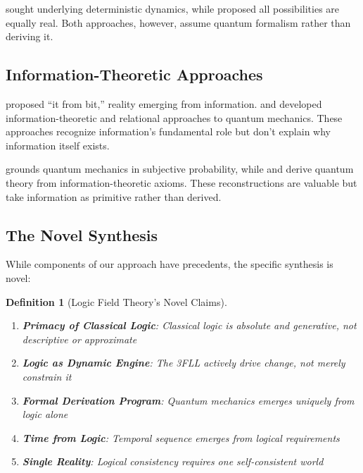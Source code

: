 \documentclass[12pt,a4paper]{article}
\newtheorem{definition}{Definition}
\begin{document}
\citet{bohm1952suggested} sought underlying deterministic dynamics, while \citet{everett1957relative} proposed all possibilities are equally real. Both approaches, however, assume quantum formalism rather than deriving it.

\subsection{Information-Theoretic Approaches}

\citet{wheeler1990information} proposed ``it from bit,'' reality emerging from information. \citet{brukner2001conceptual} and \citet{rovelli1996relational} developed information-theoretic and relational approaches to quantum mechanics. These approaches recognize information's fundamental role but don't explain why information itself exists.

\citet{fuchs2010qbism} grounds quantum mechanics in subjective probability, while \citet{hardy2001quantum} and \citet{chiribella2011informational} derive quantum theory from information-theoretic axioms. These reconstructions are valuable but take information as primitive rather than derived.

\subsection{The Novel Synthesis}

While components of our approach have precedents, the specific synthesis is novel:

\begin{definition}[Logic Field Theory's Novel Claims]
~\\
\begin{enumerate}
\item \textbf{Primacy of Classical Logic}: Classical logic is absolute and generative, not descriptive or approximate
\item \textbf{Logic as Dynamic Engine}: The 3FLL actively drive change, not merely constrain it
\item \textbf{Formal Derivation Program}: Quantum mechanics emerges uniquely from logic alone
\item \textbf{Time from Logic}: Temporal sequence emerges from logical requirements
\item \textbf{Single Reality}: Logical consistency requires one self-consistent world
\end{enumerate}
\end{definition}
\end{document}
